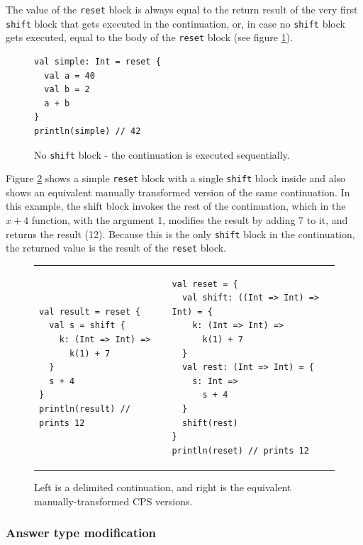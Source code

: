 The value of the \texttt{reset} block is always equal to the return result of the very first \texttt{shift} block that gets executed in the continuation, or, in case no \texttt{shift} block gets executed, equal to the body of the \texttt{reset} block (see figure  \ref{fig:example_cps_no_shift}).

\begin{figure}[h!] 
\begin{lstlisting}
val simple: Int = reset {
  val a = 40
  val b = 2
  a + b
}
println(simple) // 42
\end{lstlisting}
\caption{No \texttt{shift} block - the continuation is executed sequentially.}
\label{fig:example_cps_no_shift}
\end{figure}

Figure \ref{fig:example_cps_generic} shows a simple \texttt{reset} block with a single \texttt{shift} block inside and also shows an equivalent manually transformed version of the same continuation. In this example, the shift block invokes the rest of the continuation, which in the \(x+4\) function, with the argument 1, modifies the result by adding 7 to it, and returns the result (12). Because this is the only \texttt{shift} block in the continuation, the returned value is the result of the \texttt{reset} block.

\begin{figure}[h!]
 
\begin{tabular}{ C{7cm}  C{8cm}}

\begin{lstlisting}
val result = reset {
  val s = shift {
    k: (Int => Int) =>
      k(1) + 7
  }
  s + 4
}
println(result) // prints 12
\end{lstlisting}
&
\begin{lstlisting}
val reset = {
  val shift: ((Int => Int) => Int) = {
    k: (Int => Int) =>
      k(1) + 7
  }
  val rest: (Int => Int) = {
    s: Int =>
      s + 4
  }
  shift(rest)
}
println(reset) // prints 12
\end{lstlisting}
\\
\end{tabular}
\caption{Left is a delimited continuation, and right is the equivalent manually-transformed CPS versions.}
\label{fig:example_cps_generic}
\end{figure}

\subsubsection{Answer type modification}

